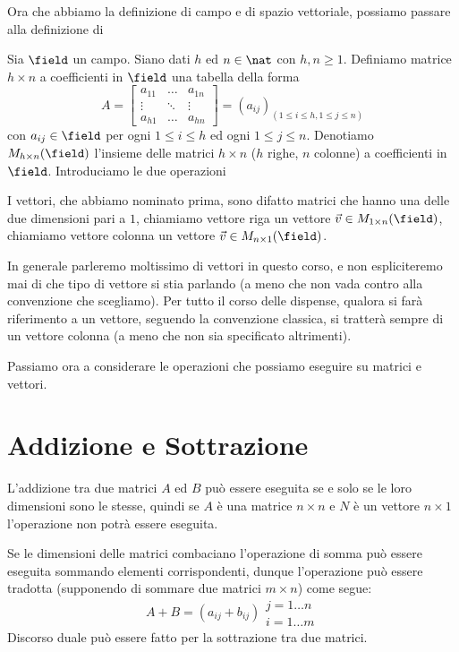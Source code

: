 Ora che abbiamo la definizione di campo e di spazio vettoriale, possiamo passare alla definizione di
\begin{definition} [Matrice]
    Sia $\field$ un campo. Siano dati $h$ ed $n \in \nat$ con $h, n \geq 1$. Definiamo matrice $h \times n$ a coefficienti in $\field$ una tabella della forma 
    \begin{equation*}
        A =
        \begin{bmatrix}
            a_{11} &\dots &a_{1n} \\
            \vdots &\ddots &\vdots \\
            a_{h1} &\dots &a_{hn}
        \end{bmatrix}
        = (a_{ij})_{(1 \leq i \leq h, 1 \leq j \leq n)}
    \end{equation*}
    con $a_{ij} \in \field$ per ogni $1 \leq i \leq h$ ed ogni $1 \leq j \leq n$. Denotiamo $M_{h \times n}(\field)$ l'insieme delle matrici $h \times n$ ($h$ righe, $n$ colonne) a coefficienti in $\field$. Introduciamo le due operazioni
\end{definition}
I vettori, che abbiamo nominato prima, sono difatto matrici che hanno una delle due dimensioni pari a $1$, chiamiamo vettore riga un vettore $\vec{v} \in M_{1 \times n}(\field)$, chiamiamo vettore colonna un vettore $\vec{v} \in M_{n \times 1}(\field)$.

In generale parleremo moltissimo di vettori in questo corso, e non espliciteremo mai di che tipo di vettore si stia parlando (a meno che non vada contro alla convenzione che scegliamo). Per tutto il corso delle dispense, qualora si farà riferimento a un vettore, seguendo la convenzione classica, si tratterà sempre di un vettore colonna (a meno che non sia specificato altrimenti).

Passiamo ora a considerare le operazioni che possiamo eseguire su matrici e vettori.
\section{Addizione e Sottrazione}
L'addizione tra due matrici $A$ ed $B$ può essere eseguita se e solo se le loro dimensioni sono le stesse, quindi se $A$ è una matrice $n \times n$ e $N$ è un vettore $n \times 1$ l'operazione non potrà essere eseguita.

Se le dimensioni delle matrici combaciano l'operazione di somma può essere eseguita sommando elementi corrispondenti, dunque l'operazione può essere tradotta (supponendo di sommare due matrici $m \times n$) come segue:
\begin{equation*}
    A + B = (a_{ij} + b_{ij})\substack{\scriptstyle j = 1 \dots n \\ \scriptstyle i = 1 \dots m}
\end{equation*}
Discorso duale può essere fatto per la sottrazione tra due matrici.
